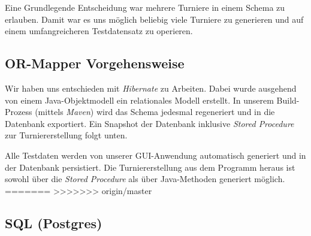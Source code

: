 \documentclass[11pt,german]{scrartcl}
\begin{document}
Eine Grundlegende Entscheidung war mehrere Turniere in einem Schema zu erlauben. Damit war es uns möglich beliebig viele Turniere zu generieren und auf einem umfangreicheren Testdatensatz zu operieren.

\subsection*{OR-Mapper Vorgehensweise}
Wir haben uns entschieden mit \emph{Hibernate} zu Arbeiten. Dabei wurde ausgehend von einem Java-Objektmodell ein relationales Modell erstellt. In unserem Build-Prozess (mittels \emph{Maven}) wird das Schema jedesmal regeneriert und in die Datenbank exportiert. Ein Snapshot der Datenbank inklusive \emph{Stored Procedure} zur Turniererstellung folgt unten.

Alle Testdaten werden von unserer GUI-Anwendung automatisch generiert und in der Datenbank persistiert. Die Turniererstellung  aus dem Programm heraus ist sowohl über die \emph{Stored Procedure} als über Java-Methoden generiert möglich.
=======
>>>>>>> origin/master

\subsection*{SQL (Postgres)}



%
\end{document}
